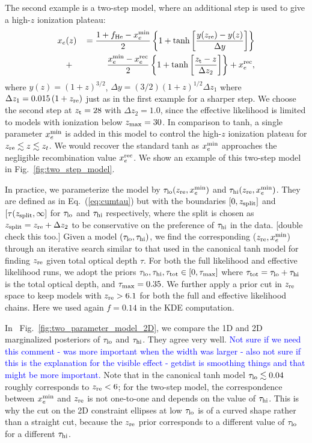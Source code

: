 \documentclass[prd,twocolumn,amsmath,amssymb,floatfix,superscriptaddress,nofootinbib]{revtex4-1}
\newcommand{\refeq}[1]{Eq.~(\ref{eq:#1})}
\newcommand{\reffig}[1]{Fig.~\ref{fig:#1}}
\newcommand{\zmax}{z_{\rm max}}
\newcommand{\zre}{z_{\rm re}}
\newcommand{\xemin}{x_e^{\rm min}}
\newcommand{\tauhi}{\tau_{\rm hi}}
\newcommand{\taulo}{\tau_{\rm lo}}
\newcommand{\bea}{\begin{eqnarray}}
\newcommand{\eea}{\end{eqnarray}}
\newcommand{\wh}[1]{\textcolor{blue}{#1}}
\begin{document}
 
The second example is a two-step model, where an additional step is used to give a high-$z$ ionization plateau: 
 \bea
x_e&(z)&\,= \frac{1+f_{\rm He} - \xemin}{2}\left\{  1+ \tanh\left[ \frac{y(z_{\rm re})-y(z)}{\Delta y} \right] \right\} \notag \\
&+& \frac{\xemin - x_e^{\rm rec}}{2}\left\{  1+ \tanh\left[ \frac{z_{\rm t}-z}{\Delta z_{2}} \right] \right\} + x_e^{\rm rec},
 \label{eqn:tanh_highz}
 \eea
where $y(z)=(1+z)^{3/2}$, $\Delta y=(3/2)(1+z)^{1/2}\Delta z_1$ where $\Delta z_1 = 0.015\, (1+z_{\rm re})$ just as in the first example for a sharper step.
We choose the second step at $z_{\rm t}=28$ with $\Delta z_2 = 1.0$, since the effective likelihood is limited to models with ionization below $\zmax=30$. 
In comparison to tanh, a single parameter $\xemin$ is added in this model to control the high-$z$ ionization plateau for $z_{\rm re} \lesssim z \lesssim z_t$. We would recover the standard tanh as $\xemin$ approaches the negligible recombination value $x_e^{\rm rec}$. We show an example
of this two-step model in Fig.~\ref{fig:two_step_model}.



In practice, we parameterize the model by $\taulo(\zre, \xemin)$ and $\tauhi(\zre, \xemin)$.  They are defined as in \refeq{cumtau} but with the boundaries $[0, z_{\rm split}]$ and $[\tau(z_{\rm split}, \infty]$ for $\taulo$ and $\tauhi$ respectively, where the split is chosen as $z_{\rm split} = \zre + \Delta z_2$ to be conservative on the preference of $\tauhi$ in the data. [double check this too.]
Given a model $(\taulo, \tauhi)$, we find the corresponding ($\zre, \xemin$) through an iterative search similar to that used in the canonical tanh model for finding $\zre$ given total optical depth $\tau$. 
For both the full likelihood and effective likelihood runs, we adopt the priors $\taulo, \tauhi, \tau_{\rm tot} \in [0, \tau_{\rm max}]$ where  $\tau_{\rm tot} = \taulo + \tauhi$ is the total optical depth, and $\tau_{\rm max} = 0.35$. 
We further apply a prior cut in $\zre$ space to keep models with $\zre > 6.1$ for both the full and effective likelihood chains. Here we used again $f = 0.14$ in the KDE computation. 

In ~\reffig{two_parameter_model_2D}, we compare the 1D and 2D marginalized posteriors of $\taulo$ and $\tauhi$. They agree very well. 
\wh{Not sure if we need this comment - was more important when the width was larger - also not sure if this is the explanation for the visible effect - getdist is smoothing things and that might be more important.}
Note that in the canonical tanh model $\taulo \lesssim 0.04$ roughly corresponds to $\zre < 6$; for the two-step model, the correspondence between $\xemin$ and $\zre$ is not one-to-one and depends on the value of $\tauhi$. This is why the cut on the 2D constraint ellipses at low $\taulo$ is of a curved shape rather than a straight cut, because the $\zre$ prior corresponds to a different value of $\taulo$ for a different $\tauhi$. 
\end{document}
